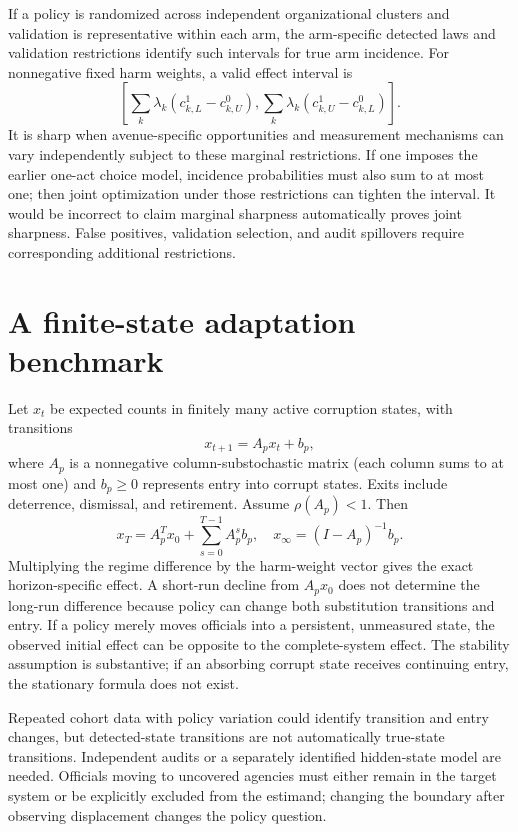 \documentclass[11pt]{article}
\begin{document}
If a policy is randomized across independent organizational clusters and validation is representative within each arm, the arm-specific detected laws and validation restrictions identify such intervals for true arm incidence. For nonnegative fixed harm weights, a valid effect interval is
\[
 \left[\sum_k\lambda_k(c^1_{k,L}-c^0_{k,U}),
       \sum_k\lambda_k(c^1_{k,U}-c^0_{k,L})\right].
\]
It is sharp when avenue-specific opportunities and measurement mechanisms can vary independently subject to these marginal restrictions. If one imposes the earlier one-act choice model, incidence probabilities must also sum to at most one; then joint optimization under those restrictions can tighten the interval. It would be incorrect to claim marginal sharpness automatically proves joint sharpness. False positives, validation selection, and audit spillovers require corresponding additional restrictions.

\section*{A finite-state adaptation benchmark}
Let $x_t$ be expected counts in finitely many active corruption states, with transitions
\[
 x_{t+1}=A_px_t+b_p,
\]
where $A_p$ is a nonnegative column-substochastic matrix (each column sums to at most one) and $b_p\geq0$ represents entry into corrupt states. Exits include deterrence, dismissal, and retirement. Assume $\rho(A_p)<1$. Then
\[
 x_T=A_p^Tx_0+\sum_{s=0}^{T-1}A_p^sb_p,
 \quad
 x_\infty=(I-A_p)^{-1}b_p.
\]
Multiplying the regime difference by the harm-weight vector gives the exact horizon-specific effect. A short-run decline from $A_px_0$ does not determine the long-run difference because policy can change both substitution transitions and entry. If a policy merely moves officials into a persistent, unmeasured state, the observed initial effect can be opposite to the complete-system effect. The stability assumption is substantive; if an absorbing corrupt state receives continuing entry, the stationary formula does not exist.

Repeated cohort data with policy variation could identify transition and entry changes, but detected-state transitions are not automatically true-state transitions. Independent audits or a separately identified hidden-state model are needed. Officials moving to uncovered agencies must either remain in the target system or be explicitly excluded from the estimand; changing the boundary after observing displacement changes the policy question.
\end{document}
